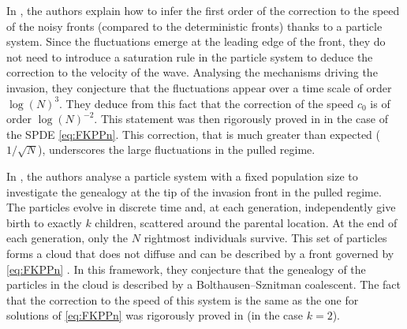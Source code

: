 \documentclass[11pt]{article}
\theoremstyle{plain}
\begin{document}
 In \cite{Brunet2006}, the authors explain how to infer the first order of the correction to the speed of the noisy fronts (compared to the deterministic fronts) thanks to a particle system. Since the fluctuations emerge at the leading edge of the front, they do not need to introduce a saturation rule in the particle system to deduce the correction to the velocity of the wave. Analysing the mechanisms driving the invasion, they conjecture that  the fluctuations appear over a time scale of order $\log(N)^3$. They deduce from this fact that the correction of the speed $c_0$ is of order $\log(N)^{-2}$. This statement was then rigorously proved in \cite{Mueller2010} in the case of the SPDE \eqref{eq:FKPPn}. This correction, that is much greater than expected ($1/\sqrt{N}$), underscores the large fluctuations in the pulled regime.


In \cite{Brunet2006a,Brunet_2007}, the authors analyse a particle system with a fixed population size to investigate the genealogy at the tip of the invasion front in the pulled regime. The particles evolve in discrete time and, at each generation, independently give birth to exactly $k$ children, scattered around the parental location. At the end of each generation, only the $N$ rightmost individuals survive. This set of particles forms a cloud that does not diffuse and can be described by a front governed by \eqref{eq:FKPPn} \cite{Brunet_2007}.  In this framework, they conjecture \cite{Brunet2006a} that the genealogy of the particles in the cloud is described by a Bolthausen--Sznitman coalescent. The fact that the correction to the speed of this system is the same as the one for solutions of \eqref{eq:FKPPn} was rigorously proved in \cite{Berard2010} (in the case $k=2$).
\end{document}
